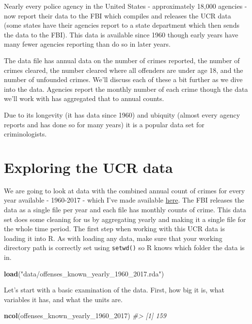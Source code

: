 \documentclass[
  12pt,
]{book}
\newenvironment{Shaded}{\begin{snugshade}}{\end{snugshade}}
\newcommand{\CommentTok}[1]{\textcolor[rgb]{0.37,0.37,0.37}{\textit{#1}}}
\newcommand{\DecValTok}[1]{\textcolor[rgb]{0.06,0.06,0.06}{#1}}
\newcommand{\KeywordTok}[1]{\textcolor[rgb]{0.27,0.27,0.27}{\textbf{#1}}}
\newcommand{\NormalTok}[1]{#1}
\newcommand{\StringTok}[1]{\textcolor[rgb]{0.5,0.5,0.5}{#1}}
\begin{document}
Nearly every police agency in the United States - approximately 18,000 agencies - now report their data to the FBI which compiles and releases the UCR data (some states have their agencies report to a state department which then sends the data to the FBI). This data is available since 1960 though early years have many fewer agencies reporting than do so in later years.

The data file has annual data on the number of crimes reported, the number of crimes cleared, the number cleared where all offenders are under age 18, and the number of unfounded crimes. We'll discuss each of these a bit further as we dive into the data. Agencies report the monthly number of each crime though the data we'll work with has aggregated that to annual counts.

Due to its longevity (it has data since 1960) and ubiquity (almost every agency reports and has done so for many years) it is a popular data set for criminologists.

\hypertarget{exploring-the-ucr-data}{%
\section{Exploring the UCR data}\label{exploring-the-ucr-data}}

We are going to look at data with the combined annual count of crimes for every year available - 1960-2017 - which I've made available \href{http://doi.org/10.3886/E100707V11}{here}. The FBI releases the data as a single file per year and each file has monthly counts of crime. This data set does some cleaning for us by aggregating yearly and making it a single file for the whole time period. The first step when working with this UCR data is loading it into R. As with loading any data, make sure that your working directory path is correctly set using \texttt{setwd()} so R knows which folder the data is in.

\begin{Shaded}
\begin{Highlighting}[]
\KeywordTok{load}\NormalTok{(}\StringTok{"data/offenses\_known\_yearly\_1960\_2017.rda"}\NormalTok{)}
\end{Highlighting}
\end{Shaded}

Let's start with a basic examination of the data. First, how big it is, what variables it has, and what the units are.

\begin{Shaded}
\begin{Highlighting}[]
\KeywordTok{ncol}\NormalTok{(offenses\_known\_yearly\_}\DecValTok{1960}\NormalTok{\_}\DecValTok{2017}\NormalTok{)}
\CommentTok{\#\textgreater{} [1] 159}
\end{Highlighting}
\end{Shaded}
\end{document}
